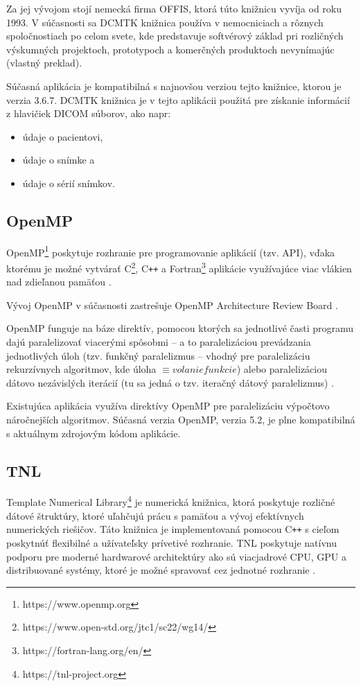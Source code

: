 Za jej vývojom stojí nemecká firma OFFIS, ktorá túto knižnicu vyvíja od roku 1993. V súčasnosti sa DCMTK knižnica používa v nemocniciach a rôznych spoločnostiach po celom svete, kde predstavuje softvérový základ pri rozličných výskumných projektoch, prototypoch a komerčných produktoch nevynímajúc \cite{dcmtk_description} (vlastný preklad).

Súčasná aplikácia je kompatibilná s najnovšou verziou tejto knižnice, ktorou je verzia 3.6.7. DCMTK knižnica je v tejto aplikácii použitá pre získanie informácií z hlavičiek DICOM súborov, ako napr:
\begin{itemize}
\item {údaje o pacientovi,}
\item {údaje o snímke a}
\item {údaje o sérií snímkov.}
\end{itemize}

\subsection {OpenMP}\label{openmp}
OpenMP\footnote{https://www.openmp.org} poskytuje rozhranie pre programovanie aplikácií (tzv. API), vďaka ktorému je možné vytvárať C\footnote{https://www.open-std.org/jtc1/sc22/wg14/}, C\texttt{++} a Fortran\footnote{https://fortran-lang.org/en/} aplikácie využívajúce viac vlákien nad zdieľanou pamäťou \cite{openmp_description}.

Vývoj OpenMP v súčasnosti zastrešuje OpenMP Architecture Review Board \cite{openmp_description}.

OpenMP funguje na báze direktív, pomocou ktorých sa jednotlivé časti programu dajú paralelizovať viacerými spôsobmi -- a to paralelizáciou prevádzania jednotlivých úloh (tzv. funkčný paralelizmus -- vhodný pre paralelizáciu rekurzívnych algoritmov, kde úloha $\equiv{ volanie funkcie}$) alebo paralelizáciou dátovo nezávislých iterácií (tu sa jedná o tzv. iteračný dátový paralelizmus) \cite{openmp_description}.

Existujúca aplikácia využíva direktívy OpenMP pre paralelizáciu výpočtovo náročnejších algoritmov. Súčasná verzia OpenMP, verzia 5.2, je plne kompatibilná s aktuálnym zdrojovým kódom aplikácie.

\subsection {TNL}\label{tnl}
Template Numerical Library\footnote{https://tnl-project.org} je numerická knižnica, ktorá poskytuje rozličné dátové štruktúry, ktoré uľahčujú prácu s pamäťou a vývoj efektívnych numerických riešičov. Táto knižnica je implementovaná pomocou C\texttt{++} s cieľom poskytnúť flexibilné a užívateľsky prívetivé rozhranie. TNL poskytuje natívnu podporu pre moderné hardwarové architektúry ako sú viacjadrové CPU, GPU a distribuované systémy, ktoré je možné spravovať cez jednotné rozhranie \cite{tnl_description}.

